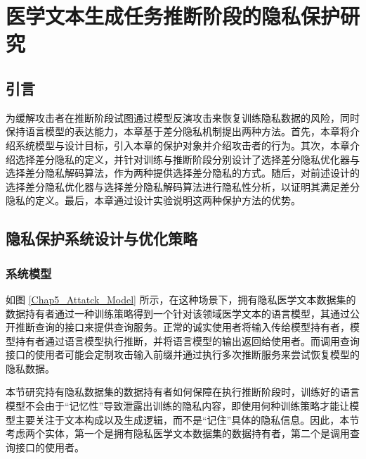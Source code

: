 
\chapter{医学文本生成任务推断阶段的隐私保护研究}

\section{引言}

为缓解攻击者在推断阶段试图通过模型反演攻击来恢复训练隐私数据的风险，同时保持语言模型的表达能力，本章基于差分隐私机制提出两种方法。首先，本章将介绍系统模型与设计目标，引入本章的保护对象并介绍攻击者的行为。其次，本章介绍选择差分隐私的定义，并针对训练与推断阶段分别设计了选择差分隐私优化器与选择差分隐私解码算法，作为两种提供选择差分隐私的方式。随后，对前述设计的选择差分隐私优化器与选择差分隐私解码算法进行隐私性分析，以证明其满足差分隐私的定义。最后，本章通过设计实验说明这两种保护方法的优势。

\section{隐私保护系统设计与优化策略}

\subsection{系统模型}

如图 \ref{Chap5_Attatck_Model} 所示，在这种场景下，拥有隐私医学文本数据集的数据持有者通过一种训练策略得到一个针对该领域医学文本的语言模型，其通过公开推断查询的接口来提供查询服务。正常的诚实使用者将输入传给模型持有者，模型持有者通过语言模型执行推断，并将语言模型的输出返回给使用者。而调用查询接口的使用者可能会定制攻击输入前缀并通过执行多次推断服务来尝试恢复模型的隐私数据。

本节研究持有隐私数据集的数据持有者如何保障在执行推断阶段时，训练好的语言模型不会由于“记忆性”导致泄露出训练的隐私内容，即使用何种训练策略才能让模型主要关注于文本构成以及生成逻辑，而不是“记住”具体的隐私信息。因此，本节考虑两个实体，第一个是拥有隐私医学文本数据集的数据持有者，第二个是调用查询接口的使用者。






